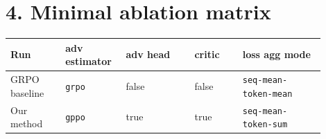\documentclass[11pt]{article}
\begin{document}
\section*{4. Minimal ablation matrix}
\begin{center}
\begin{tabular}{|p{0.16\linewidth}|p{0.16\linewidth}|p{0.20\linewidth}|p{0.14\linewidth}|p{0.24\linewidth}|}
\hline
\textbf{Run} & \textbf{adv estimator} & \textbf{adv head} & \textbf{critic} & \textbf{loss agg mode} \\
\hline
GRPO baseline & \texttt{grpo} & false & false & \texttt{seq-mean-token-mean} \\
\hline
Our method & \texttt{gppo} & true & true & \texttt{seq-mean-token-sum} \\
\hline
\end{tabular}
\end{center}
\end{document}
